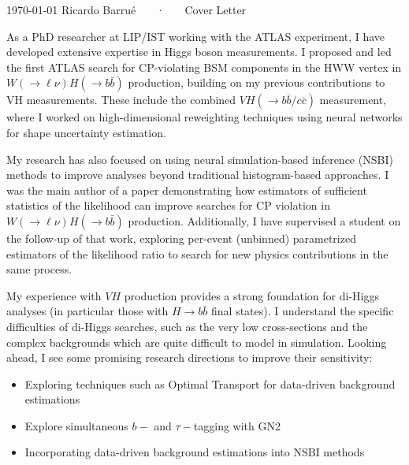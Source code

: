 \documentclass[11pt, a4paper]{awesome-cv}
\begin{document}
\makecvheader[R]

\makecvfooter
  {\today}
  {Ricardo Barrué ~~~·~~~ Cover Letter}
  {}

\makelettertitle

\begin{cvletter}

  As a PhD researcher at LIP/IST working with the ATLAS experiment, I have developed extensive expertise in Higgs boson measurements. I proposed and led the first ATLAS search for CP-violating BSM components in the HWW vertex in $W(\to \ell \nu)H(\to b\bar{b})$ production, building on my previous contributions to VH measurements. These include the combined $VH(\to b\bar{b}/c\bar{c})$ measurement, where I worked on high-dimensional reweighting techniques using neural networks for shape uncertainty estimation. 

  My research has also focused on using neural simulation-based inference (NSBI) methods to improve analyses beyond traditional histogram-based approaches. I was the main author of a paper demonstrating how estimators of sufficient statistics of the likelihood can improve searches for CP violation in $W(\to \ell \nu)H(\to b\bar{b})$ production. Additionally, I have supervised a student on the follow-up of that work, exploring per-event (unbinned) parametrized estimators of the likelihood ratio to search for new physics contributions in the same process.

  My experience with $VH$ production provides a strong foundation for di-Higgs analyses (in particular those with $H\to b\bar{b}$ final states). I understand the specific difficulties of di-Higgs searches, such as the very low cross-sections and the complex backgrounds which are quite difficult to model in simulation. Looking ahead, I see some promising research directions to improve their sensitivity:
  \begin{itemize}
    \item Exploring techniques such as Optimal Transport for data-driven background estimations
    \item Explore simultaneous $b-$ and $\tau-$tagging with GN2
    \item Incorporating data-driven background estimations into NSBI methods
  \end{itemize}


\end{cvletter}
\end{document}
